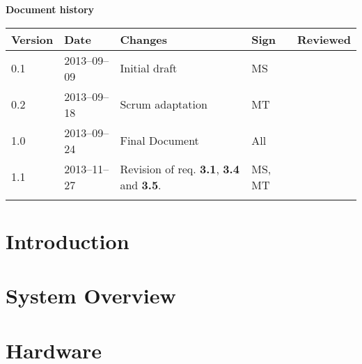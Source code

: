 \documentclass[10pt, a4paper, twoside]{article}
\numberwithin{equation}{subsection}
\numberwithin{figure}{section}
\numberwithin{table}{section}
\begin{document}



\newpage
\pagestyle{fancy}
\setcounter{page}{2} %



\newpage
\tableofcontents
\listoffigures


\newpage
\vspace*{5\baselineskip}

\begin{center}
\textbf{\LARGE Document history}

{ \footnotesize 
\begin{tabular}{|p{1cm}|p{2.0cm}|p{5cm}|p{1.5cm}|p{2cm}|}
	\hline
	\textbf{Version} & \textbf{Date} & \textbf{Changes} & \textbf{Sign} & \textbf{Reviewed} \\
	
	\hline
	0.1 & 2013--09--09 & Initial draft & MS & \\
	\hline
	0.2 & 2013--09--18 & Scrum adaptation & MT & \\
	\hline
	1.0 & 2013--09--24 & Final Document & All & \\
	\hline
	1.1 & 2013--11--27 & Revision of req. \textbf{3.1}, \textbf{3.4} and \textbf{3.5}. & MS, MT & \\
	
	\hline
	 &  &  &  &  \\
	
	\hline
\end{tabular}
}
\end{center}



%
%
\newpage
{}


\newpage
\section{Introduction}
\label{sec:introduction}


\newpage
\section{System Overview}
\label{sec:system_overview}


\newpage
\section{Hardware}
\label{sec:hardware}

\end{document}
